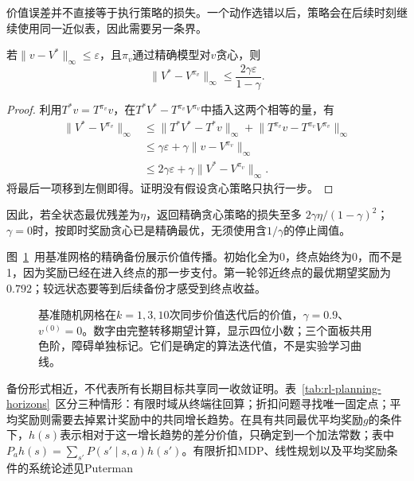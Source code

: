 价值误差并不直接等于执行策略的损失。一个动作选错以后，策略会在后续时刻继续使用同一近似表，因此需要另一条界。

\begin{theorem}[由价值精度到贪心策略性能]
 \label{thm:rl-planning-greedy-loss}
 若$\lVert v-V^*\rVert_\infty\leq\varepsilon$，且$\pi_v$通过精确模型对$v$贪心，则
 \begin{equation}
 \lVert V^*-V^{\pi_v}\rVert_\infty
 \leq\frac{2\gamma\varepsilon}{1-\gamma}.
 \label{eq:rl-planning-greedy-loss}
 \end{equation}
\end{theorem}
\begin{proof}
 利用$T^*v=T^{\pi_v}v$，在$T^*V^*-T^{\pi_v}V^{\pi_v}$中插入这两个相等的量，有
 \[
 \begin{aligned}
 \lVert V^*-V^{\pi_v}\rVert_\infty
 &\leq\lVert T^*V^*-T^*v\rVert_\infty
       +\lVert T^{\pi_v}v-T^{\pi_v}V^{\pi_v}\rVert_\infty\\
 &\leq\gamma\varepsilon+
       \gamma\lVert v-V^{\pi_v}\rVert_\infty\\
 &\leq2\gamma\varepsilon+
       \gamma\lVert V^*-V^{\pi_v}\rVert_\infty.
 \end{aligned}
 \]
 将最后一项移到左侧即得。证明没有假设贪心策略只执行一步。
\end{proof}

因此，若全状态最优残差为$\eta$，返回精确贪心策略的损失至多
$2\gamma\eta/(1-\gamma)^2$；$\gamma=0$时，按即时奖励贪心已是精确最优，无须使用含$1/\gamma$的停止阈值。

图~\ref{fig:rl-planning-grid-values}~用基准网格的精确备份展示价值传播。初始化全为0，终点始终为0，而不是1，因为奖励已经在进入终点的那一步支付。第一轮邻近终点的最优期望奖励为$0.792$；较远状态要等到后续备份才感受到终点收益。

\begin{figure}[htbp]
 \centering
 
 \caption{基准随机网格在$k=1,3,10$次同步价值迭代后的价值，$\gamma=0.9$、$v^{(0)}=0$。数字由完整转移期望计算，显示四位小数；三个面板共用色阶，障碍单独标记。它们是确定的算法迭代值，不是实验学习曲线。}
 \label{fig:rl-planning-grid-values}
\end{figure}

备份形式相近，不代表所有长期目标共享同一收敛证明。表~\ref{tab:rl-planning-horizons}~区分三种情形：有限时域从终端往回算；折扣问题寻找唯一固定点；平均奖励则需要去掉累计奖励中的共同增长趋势。在具有共同最优平均奖励$g$的条件下，$h(s)$表示相对于这一增长趋势的差分价值，只确定到一个加法常数；表中$P_ah(s)=\sum_{s'}P(s'\mid s,a)h(s')$。有限折扣MDP、线性规划以及平均奖励条件的系统论述见Puterman

